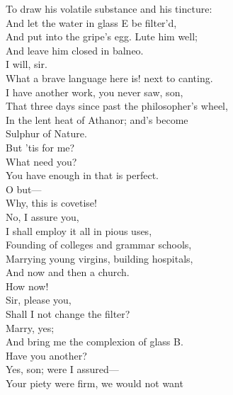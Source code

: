 \documentclass[a4paper,oneside]{memoir}
\begin{document}
\begin{drama*}
To draw his volatile substance and his tincture:\\
And let the water in glass E be filter'd,\\
And put into the gripe's egg. Lute him well;\\
And leave him closed in balneo.\\
\facespeaks {}  I will, sir.\\
\surlyspeaks What a brave language here is! next to canting.\\
\subtlespeaks I have another work, you never saw, son,\\
That three days since past the philosopher's wheel,\\
In the lent heat of Athanor; and's become\\
Sulphur of Nature.\\
\mammonspeaks {} But 'tis for me?\\
\subtlespeaks {} What need you?\\
You have enough in that is perfect.\\
\mammonspeaks {} O but---\\
\subtlespeaks Why, this is covetise!\\
\mammonspeaks {} No, I assure you,\\
I shall employ it all in pious uses,\\
Founding of colleges and grammar schools,\\
Marrying young virgins, building hospitals,\\
And now and then a church.\\
\subtlespeaks {} How now!\\
\facespeaks {} Sir, please you,\\
Shall I not change the filter?\\
\subtlespeaks {} Marry, yes;\\
And bring me the complexion of glass B.\\
\mammonspeaks Have you another?\\
\subtlespeaks {} Yes, son; were I assured---\\
Your piety were firm, we would not want\\

\end{drama*}
\end{document}
